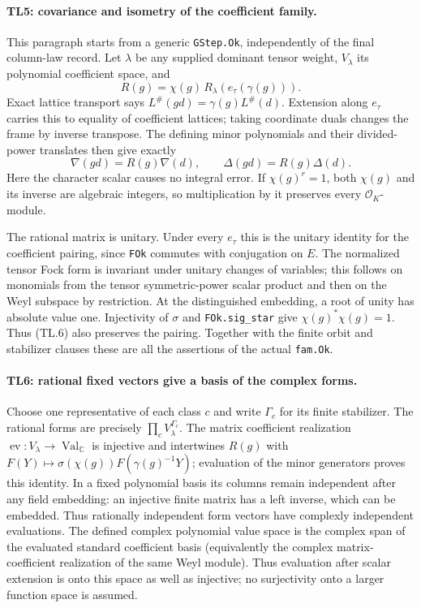 \documentclass[11pt,a4paper]{article}
\numberwithin{equation}{section}
\theoremstyle{remark}\newtheorem{remark}[theorem]{Remark}
\begin{document}
\paragraph{TL5: covariance and isometry of the coefficient family.}
This paragraph starts from a generic \texttt{GStep.Ok}, independently
of the final column-law record. Let $\lambda$ be any supplied
dominant tensor weight, $V_\lambda$ its polynomial coefficient space,
and
\[
 R(g)=\chi(g)\,R_\lambda(e_\tau(\gamma(g))) .       \tag{TL.6}
\]
Exact lattice transport says
$L^\#(gd)=\gamma(g)L^\#(d)$. Extension along $e_\tau$ carries this
to equality of coefficient lattices; taking coordinate duals changes
the frame by inverse transpose. The defining minor polynomials and
their divided-power translates then give exactly
\[
 \nabla(gd)=R(g)\nabla(d),\qquad
 \Delta(gd)=R(g)\Delta(d).                         \tag{TL.7}
\]
Here the character scalar causes no integral error. If
$\chi(g)^r=1$, both $\chi(g)$ and its inverse are algebraic integers,
so multiplication by it preserves every $\mathcal O_K$-module.

The rational matrix is unitary. Under every $e_\tau$ this is the
unitary identity for the coefficient pairing, since \texttt{FOk}
commutes with conjugation on $E$. The normalized tensor Fock form
is invariant under unitary changes of variables; this follows on
monomials from the tensor symmetric-power scalar product and then
on the Weyl subspace by restriction. At the distinguished embedding,
a root of unity has absolute value one. Injectivity of $\sigma$
and \texttt{FOk.sig\_\allowbreak star} give
$\chi(g)^*\chi(g)=1$. Thus (TL.6) also preserves the pairing.
Together with the finite orbit and stabilizer clauses these are all
the assertions of the actual \texttt{fam.Ok}.

\paragraph{TL6: rational fixed vectors give a basis of the complex
forms.}
Choose one representative of each class $c$ and write $\Gamma_c$
for its finite stabilizer. The rational forms are precisely
$\prod_c V_\lambda^{\Gamma_c}$. The matrix coefficient realization
$\operatorname{ev}:V_\lambda\to\operatorname{Val}_{\mathbb C}$ is
injective and intertwines $R(g)$ with
$F(Y)\mapsto\sigma(\chi(g))F(\gamma(g)^{-1}Y)$; evaluation of the
minor generators proves this identity. In a fixed polynomial basis
its columns remain independent after any field embedding: an
injective finite matrix has a left inverse, which can be embedded.
Thus rationally independent form vectors have complexly independent
evaluations. The defined complex polynomial value space is the
complex span of the evaluated standard coefficient basis (equivalently
the complex matrix-coefficient realization of the same Weyl module).
Thus evaluation after scalar extension is onto this space as well
as injective; no surjectivity onto a larger function space is assumed.
\end{document}
